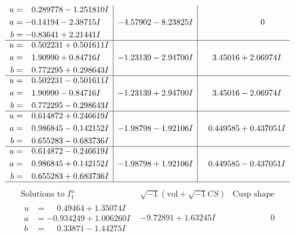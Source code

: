 \documentclass[1p]{elsarticle_modified}
\theoremstyle{definition}
\newcommand{\I}{\sqrt{-1}}
\begin{document}
$$\begin{array}{c|c|c}
\begin{aligned}
u &= \phantom{-}0.289778 - 1.251810 I \\
a &= -0.14194 - 2.38715 I \\
b &= -0.83641 + 2.21441 I\end{aligned}
 & -4.57902 - 8.23825 I & \phantom{-0.000000 } 0 \\ \hline\begin{aligned}
u &= \phantom{-}0.502231 + 0.501611 I \\
a &= \phantom{-}1.90990 + 0.84716 I \\
b &= \phantom{-}0.772295 + 0.298643 I\end{aligned}
 & -1.23139 - 2.94700 I & \phantom{-}3.45016 + 2.06974 I \\ \hline\begin{aligned}
u &= \phantom{-}0.502231 - 0.501611 I \\
a &= \phantom{-}1.90990 - 0.84716 I \\
b &= \phantom{-}0.772295 - 0.298643 I\end{aligned}
 & -1.23139 + 2.94700 I & \phantom{-}3.45016 - 2.06974 I \\ \hline\begin{aligned}
u &= \phantom{-}0.614872 + 0.246619 I \\
a &= \phantom{-}0.986845 - 0.142152 I \\
b &= \phantom{-}0.655283 - 0.683736 I\end{aligned}
 & -1.98798 - 1.92106 I & \phantom{-}0.449585 + 0.437051 I \\ \hline\begin{aligned}
u &= \phantom{-}0.614872 - 0.246619 I \\
a &= \phantom{-}0.986845 + 0.142152 I \\
b &= \phantom{-}0.655283 + 0.683736 I\end{aligned}
 & -1.98798 + 1.92106 I & \phantom{-}0.449585 - 0.437051 I\\
 \hline 
 \end{array}$$\newpage$$\begin{array}{c|c|c}  
\text{Solutions to }I^u_{1}& \I (\text{vol} + \sqrt{-1}CS) & \text{Cusp shape}\\
 \hline 
\begin{aligned}
u &= \phantom{-}0.49464 + 1.35074 I \\
a &= -0.934249 + 1.006260 I \\
b &= \phantom{-}0.33871 - 1.44275 I\end{aligned}
 & -9.72891 + 1.63245 I & \phantom{-0.000000 } 0 \\ \hline\begin{aligned}

\end{aligned}
\end{array}$$
\end{document}
